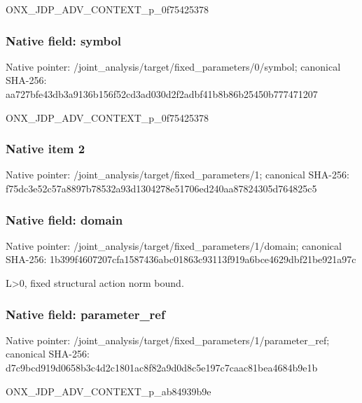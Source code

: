 \documentclass[10pt,a4paper]{article}
\begin{document}
\begingroup\raggedright\sloppy ONX\_\allowbreak{}JDP\_\allowbreak{}ADV\_\allowbreak{}CONTEXT\_\allowbreak{}p\_\allowbreak{}0f75425378\par\endgroup

\subsubsection{Native field: symbol}
Native pointer: /joint\_\allowbreak{}analysis/target/fixed\_\allowbreak{}parameters/0/symbol; canonical SHA-256: aa727bfe43db3a9136b156f52cd3ad030d2f2adbf41b8b86b25450b777471207

\begingroup\raggedright\sloppy ONX\_\allowbreak{}JDP\_\allowbreak{}ADV\_\allowbreak{}CONTEXT\_\allowbreak{}p\_\allowbreak{}0f75425378\par\endgroup

\subsubsection{Native item 2}
Native pointer: /joint\_\allowbreak{}analysis/target/fixed\_\allowbreak{}parameters/1; canonical SHA-256: f75dc3e52c57a8897b78532a93d1304278e51706ed240aa87824305d764825c5

\subsubsection{Native field: domain}
Native pointer: /joint\_\allowbreak{}analysis/target/fixed\_\allowbreak{}parameters/1/domain; canonical SHA-256: 1b399f4607207cfa1587436abc01863c93113f919a6bce4629dbf21be921a97c

\begingroup\raggedright\sloppy L>0,\allowbreak{} fixed structural action norm bound.\par\endgroup

\subsubsection{Native field: parameter\_\allowbreak{}ref}
Native pointer: /joint\_\allowbreak{}analysis/target/fixed\_\allowbreak{}parameters/1/parameter\_\allowbreak{}ref; canonical SHA-256: d7c9bcd919d0658b3c4d2c1801ac8f82a9d0d8c5e197c7caac81bea4684b9e1b

\begingroup\raggedright\sloppy ONX\_\allowbreak{}JDP\_\allowbreak{}ADV\_\allowbreak{}CONTEXT\_\allowbreak{}p\_\allowbreak{}ab84939b9e\par\endgroup
\end{document}
